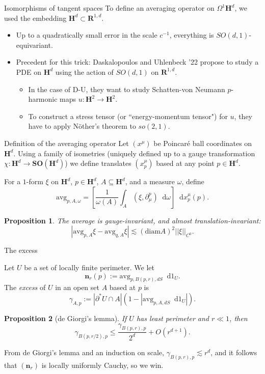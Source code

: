 \documentclass[10pt]{beamer}
\newcommand{\RR}{\mathbf{R}}
\newcommand{\Hyp}{\mathbf H}
\newcommand{\SpOrth}{\mathbf{SO}}
\newcommand*\dif{\mathop{}\!\mathrm{d}}
\newcommand{\dfn}[1]{\emph{#1}\index{#1}}
\newcommand{\avg}{\mathrm{avg}}
\newcommand{\normal}{\mathbf n}
\newtheorem{proposition}{Proposition}
\begin{document}
\begin{frame}{Isomorphisms of tangent spaces}
To define an averaging operator on $\Omega^1\Hyp^d$, we used the embedding $\Hyp^d \subset \RR^{1, d}$.
\begin{itemize}
\item Up to a quadratically small error in the scale $c^{-1}$, everything is $SO(d, 1)$-equivariant.
\item Precedent for this trick: Daskalopoulos and Uhlenbeck '22 propose to study a PDE on $\Hyp^d$ using the action of $SO(d, 1)$ on $\RR^{1, d}$.
\begin{itemize}
\item In the case of D-U, they want to study Schatten-von Neumann $p$-harmonic maps $u: \Hyp^2 \to \Hyp^2$.
\item To construct a stress tensor (or ``energy-momentum tensor") for $u$, they have to apply N\"other's theorem to $so(2, 1)$.
\end{itemize}
\end{itemize}
\end{frame}

\begin{frame}{Definition of the averaging operator}
Let $(x^\mu)$ be Poincar\'e ball coordinates on $\Hyp^d$.
Using a family of isometries (uniquely defined up to a gauge transformation $\chi: \Hyp^d \to \SpOrth(\Hyp^d)$) we define translates $(x^\mu_p)$ based at any point $p \in \Hyp^d$.

\begin{definition}
For a $1$-form $\xi$ on $\Hyp^d$, $p \in \Hyp^d$, $A \subseteq \Hyp^d$, and a measure $\omega$, define
$$\avg_{p, A, \omega} = \left[\frac{1}{\omega(A)} \int_A (\xi, \partial_\mu^p) \dif \omega\right] \dif x^\mu_p(p).$$
\end{definition}

\begin{proposition}
The average is gauge-invariant, and almost translation-invariant:
$$|\avg_{p, A} \xi - \avg_{q, A} \xi| \lesssim (\mathrm{diam} A)^2 ||\xi||_{C^0}.$$
\end{proposition}
\end{frame}

\begin{frame}{The excess}
\begin{definition}
Let $U$ be a set of locally finite perimeter. We let
$$\normal_r(p) := \avg_{p, B(p, r), dS} \dif 1_U.$$
The \dfn{excess} of $U$ in an open set $A$ based at $p$ is
$$\gamma_{A, p} := |\partial^* U \cap A|\left(1 - \left|\avg_{p, A, dS} \dif 1_U\right|\right).$$
\end{definition}

\begin{proposition}[de Giorgi's lemma]
If $U$ has least perimeter and $r \ll 1$, then
$$\gamma_{B(p, r/2), p} \leq \frac{\gamma_{B(p, r), p}}{2^d} + O(r^{d + 1}).$$
\end{proposition}

From de Giorgi's lemma and an induction on scale, $\gamma_{B(p, r), p} \lesssim r^d$, and it follows that $(\normal_r)$ is locally uniformly Cauchy, so we win.
\end{frame}
\end{document}

